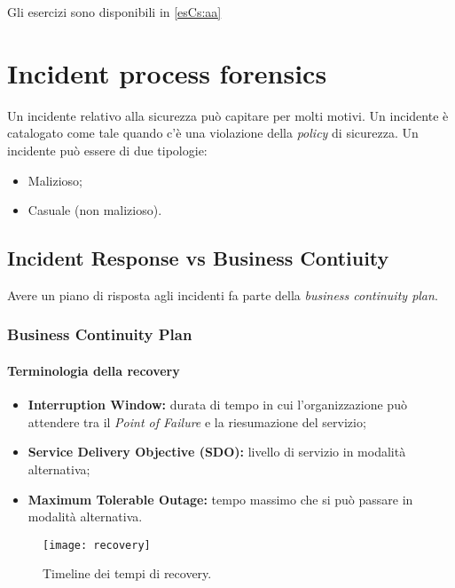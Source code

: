 Gli esercizi sono disponibili in \ref{esCs:aa}

\part{Incident process forensics}

Un incidente relativo alla sicurezza può capitare per molti motivi. Un
incidente è catalogato come tale quando c'è una violazione della \textit{policy}
di sicurezza. Un incidente può essere di due tipologie:
\begin{itemize}
\item Malizioso;
\item Casuale (non malizioso).
\end{itemize}

\chapter{Incident Response vs Business Contiuity}
\label{IRBC}

Avere un piano di risposta agli incidenti fa parte della \textit{business
continuity plan}.

\section{Business Continuity Plan}

\subsection{Terminologia della recovery}

\begin{itemize}
\item \textbf{Interruption Window:} durata di tempo in cui l'organizzazione può attendere 
tra il \textit{Point of Failure} e la riesumazione del servizio;
\item \textbf{Service Delivery Objective (SDO):} livello di servizio in modalità alternativa;
\item \textbf{Maximum Tolerable Outage:} tempo massimo che si può passare in modalità alternativa.
\end{itemize}

\begin{figure}[h!]
        \begin{center}
                \texttt{[image: recovery]}
        \end{center}
        \caption{Timeline dei tempi di recovery.}
        \label{fig:audit:hooks}
\end{figure}

